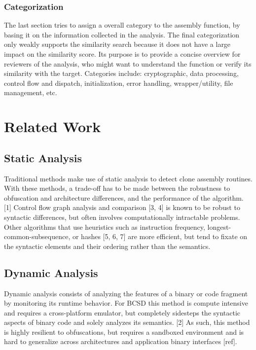 \documentclass[conference,compsoc]{IEEEtran}
\begin{document}
\subsubsection{Categorization}

The last section tries to assign a overall category to the assembly function, by basing it on the information
collected in the analysis. The final categorization only weakly supports the similarity search because it does
not have a large impact on the similarity score. Its purpose is to provide a concise overview for reviewers
of the analysis, who might want to understand the function or verify its similarity with the target.
Categories include: cryptographic, data processing, control flow and dispatch, initialization, error handling,
wrapper/utility, file management, etc.

\section{Related Work}

\subsection{Static Analysis}

Traditional methods make use of static analysis to detect clone assembly routines. With these methods, a trade-off has
to be made between the robustness to obfuscation and architecture differences, and the performance of the algorithm. [1]
Control flow graph analysis and comparison [3, 4] is known to be robust to syntactic differences, but often involves computationally intractable
problems. Other algorithms that use heuristics such as instruction frequency, longest-common-subsequence, or hashes [5, 6, 7] are more
efficient, but tend to fixate on the syntactic elements and their ordering rather than the semantics.

\subsection{Dynamic Analysis}

Dynamic analysis consists of analyzing the features of a binary or code fragment by monitoring its runtime behavior. For BCSD
this method is compute intensive and requires a cross-platform emulator, but completely sidesteps the syntactic aspects of binary code
and solely analyzes its semantics. [2] As such, this method is highly resilient to obfuscations, but requires a sandboxed environment
and is hard to generalize across architectures and application binary interfaces [ref].
\end{document}
